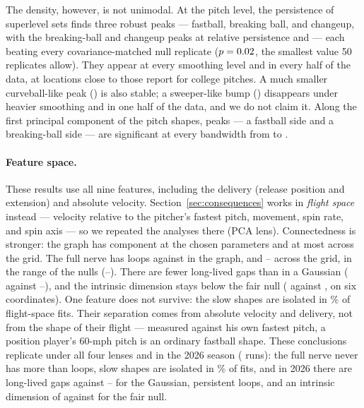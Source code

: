 \documentclass{article}
\theoremstyle{definition}
\theoremstyle{remark}
\begin{document}
The density, however, is not unimodal.
At the pitch level, the persistence of superlevel sets finds three robust peaks --- fastball, breaking ball, and changeup, with the breaking-ball and changeup peaks at relative persistence \PeakBB{} and \PeakCH{} --- each beating every covariance-matched null replicate ($p = 0.02$, the smallest value 50 replicates allow).
They appear at every smoothing level and in every half of the data, at locations close to those \textcite{maloof2026classify} report for college pitches.
A much smaller curveball-like peak (\PeakCurve) is also stable; a sweeper-like bump (\PeakSweep) disappears under heavier smoothing and in one half of the data, and we do not claim it.
Along the first principal component of the pitch shapes, \PCPeaks{} peaks --- a fastball side and a breaking-ball side --- are significant at every bandwidth from \PCBandLo{} to \PCBandHi.

\paragraph{Feature space.} These results use all nine features, including the delivery (release position and extension) and absolute velocity. Section~\ref{sec:consequences} works in \emph{flight space} instead --- velocity relative to the pitcher's fastest pitch, movement, spin rate, and spin axis --- so we repeated the analyses there (PCA lens). Connectedness is stronger: the graph has \FlComp{} component at the chosen parameters and at most \FlGridCompMax{} across the grid. The full nerve has \FlNerveBone{} loops against \FlGraphBone{} in the graph, and \FlGridNerveMin--\FlGridNerveMax{} across the grid, in the range of the nulls (\FlNullNerveMin--\FlNullNerveMax). There are fewer long-lived gaps than in a Gaussian (\FlLongBars{} against \FlGaussLongBarsLo--\FlGaussLongBarsHi), and the intrinsic dimension stays below the fair null (\FlDimMLE{} against \FlDimNullMLE{}, on six coordinates). One feature does not survive: the slow shapes are isolated in \FlSlowIso\% of flight-space fits. Their separation comes from absolute velocity and delivery, not from the shape of their flight --- measured against his own fastest pitch, a position player's 60-mph pitch is an ordinary fastball shape. These conclusions replicate under all four lenses and in the 2026 season (\FlRuns{} runs): the full nerve never has more than \FlAllNerveMax{} loops, slow shapes are isolated in \FlAllSlowIso\% of fits, and in 2026 there are \FlSixLongBars{} long-lived gaps against \FlSixGaussLo--\FlSixGaussHi{} for the Gaussian, \FlSixLoops{} persistent loops, and an intrinsic dimension of \FlSixDim{} against \FlSixDimNull{} for the fair null.
\end{document}
